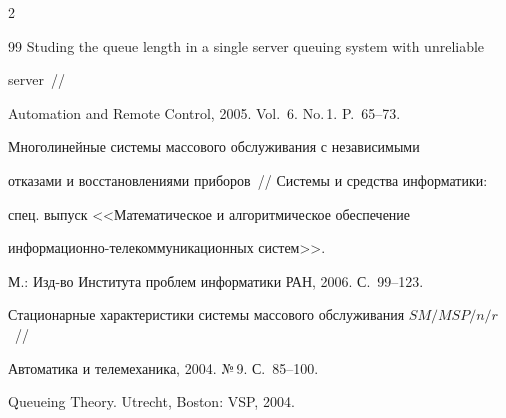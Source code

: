 \begin{multicols}{2}
{{\begin{thebibliography}{99}
Studing the queue length in a single server queuing system with unreliable


server~//


Automation and Remote Control, 2005. Vol.~6. No.\,1. P.~65--73.









Многолинейные системы массового обслуживания с независимыми


отказами и восстановлениями приборов~// Системы и средства информатики:


спец. выпуск <<Математическое и алгоритмическое обеспечение


информационно-телекоммуникационных систем>>.


М.: Изд-во Института проблем информатики РАН, 2006. С.~99--123.









Стационарные характеристики системы массового обслуживания $SM/MSP/n/r$~//


Автоматика и телемеханика, 2004. №\,9. С.~85--100.









Queueing Theory. Utrecht, Boston: VSP, 2004.





\end{thebibliography}





}


}








\end{multicols}





\label{end\stat}


